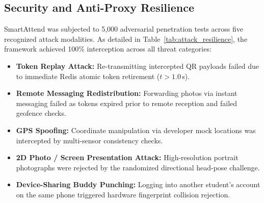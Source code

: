 \documentclass[conference]{IEEEtran}
\begin{document}
\subsection{Security and Anti-Proxy Resilience}
SmartAttend was subjected to 5,000 adversarial penetration tests across five recognized attack modalities. As detailed in Table~\ref{tab:attack_resilience}, the framework achieved 100\% interception across all threat categories:
\begin{itemize}
    \item \textbf{Token Replay Attack:} Re-transmitting intercepted QR payloads failed due to immediate Redis atomic token retirement ($t > 1.0$\,s).
    \item \textbf{Remote Messaging Redistribution:} Forwarding photos via instant messaging failed as tokens expired prior to remote reception and failed geofence checks.
    \item \textbf{GPS Spoofing:} Coordinate manipulation via developer mock locations was intercepted by multi-sensor consistency checks.
    \item \textbf{2D Photo / Screen Presentation Attack:} High-resolution portrait photographs were rejected by the randomized directional head-pose challenge.
    \item \textbf{Device-Sharing Buddy Punching:} Logging into another student's account on the same phone triggered hardware fingerprint collision rejection.
\end{itemize}

\begin{table}[t]
\centering
\caption{Adversarial Spoofing and Proxy Attack Resilience}
\label{tab:attack_resilience}
\end{table}
\end{document}
